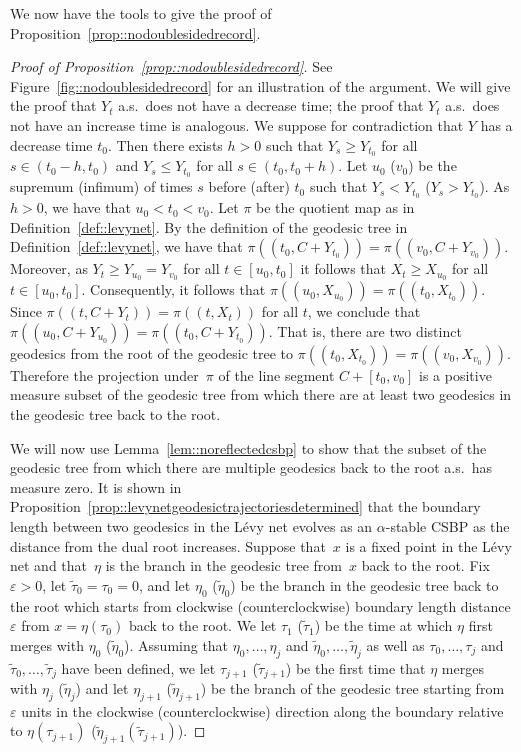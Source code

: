 \documentclass[10pt]{amsart}
\let\epsilon\varepsilon
\theoremstyle{plain}
\numberwithin{theorem}{section}
\theoremstyle{definition}
\let\wt\widetilde
\begin{document}
We now have the tools to give the proof of Proposition~\ref{prop::nodoublesidedrecord}.

\begin{proof}[Proof of Proposition~\ref{prop::nodoublesidedrecord}]
See Figure~\ref{fig::nodoublesidedrecord} for an illustration of the argument. We will give the proof that $Y_t$ a.s.\ does not have a decrease time; the proof that $Y_t$ a.s.\ does not have an increase time is analogous. We suppose for contradiction that $Y$ has a decrease time $t_0$. Then there exists $h > 0$ such that $Y_s \geq Y_{t_0}$ for all $s \in (t_0-h,t_0)$ and $Y_s \leq Y_{t_0}$ for all $s \in (t_0,t_0+h)$. Let $u_0$ (\resp $v_0$) be the supremum (\resp infimum) of times $s$ before (\resp after) $t_0$ such that $Y_s < Y_{t_0}$ (\resp $Y_s > Y_{t_0}$). As $h > 0$, we have that $u_0 < t_0 < v_0$. Let $\pi$ be the quotient map as in Definition~\ref{def::levynet}. By the definition of the geodesic tree in Definition~\ref{def::levynet}, we have that $\pi( (t_0,C+Y_{t_0})) = \pi((v_0,C+Y_{v_0}))$. Moreover, as $Y_t \geq Y_{u_0} = Y_{v_0}$ for all $t \in [u_0,t_0]$ it follows that $X_t \geq X_{u_0}$ for all $t \in [u_0,t_0]$. Consequently, it follows that $\pi((u_0,X_{u_0})) = \pi((t_0,X_{t_0}))$. Since $\pi((t,C+Y_t)) = \pi((t,X_t))$ for all $t$, we conclude that $\pi((u_0,C+Y_{u_0})) = \pi((t_0,C+Y_{t_0}))$. That is, there are two distinct geodesics from the root of the geodesic tree to $\pi((t_0,X_{t_0})) = \pi((v_0,X_{v_0}))$. Therefore the projection under~$\pi$ of the line segment $C + [t_0,v_0]$ is a positive measure subset of the geodesic tree from which there are at least two geodesics in the geodesic tree back to the root.

We will now use Lemma~\ref{lem::noreflectedcsbp} to show that the subset of the geodesic tree from which there are multiple geodesics back to the root a.s.\ has measure zero. It is shown in Proposition~\ref{prop::levynetgeodesictrajectoriesdetermined} that the boundary length between two geodesics in the Lévy net evolves as an $\alpha$-stable CSBP as the distance from the dual root increases. Suppose that~$x$ is a fixed point in the Lévy net and that~$\eta$ is the branch in the geodesic tree from~$x$ back to the root. Fix $\epsilon > 0$, let $\wt{\tau}_0 = \tau_0 = 0$, and let $\eta_0$ (\resp $\wt{\eta}_0$) be the branch in the geodesic tree back to the root which starts from clockwise (\resp counterclockwise) boundary length distance $\epsilon$ from $x = \eta(\tau_0)$ back to the root. We let $\tau_1$ (\resp $\wt{\tau}_1$) be the time at which $\eta$ first merges with $\eta_0$ (\resp $\wt{\eta}_0$). Assuming that $\eta_0,\ldots,\eta_j$ and $\wt{\eta}_0,\ldots,\wt{\eta}_j$ as well as $\tau_0,\ldots,\tau_j$ and $\wt{\tau}_0,\ldots,\wt{\tau}_j$ have been defined, we let $\tau_{j+1}$ (\resp $\wt{\tau}_{j+1}$) be the first time that $\eta$ merges with $\eta_j$ (\resp $\wt{\eta}_j$) and let $\eta_{j+1}$ (\resp $\wt{\eta}_{j+1}$) be the branch of the geodesic tree starting from $\epsilon$ units in the clockwise (\resp counterclockwise) direction along the boundary relative to $\eta(\tau_{j+1})$ (\resp $\wt{\eta}_{j+1}(\wt{\tau}_{j+1})$).


\end{proof}
\end{document}
